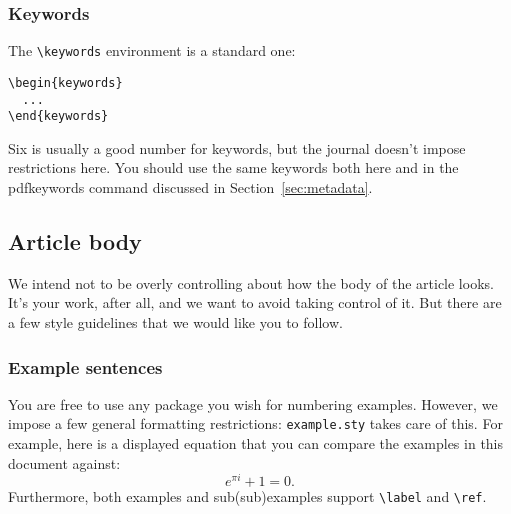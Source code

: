 \documentclass[lucida,final]{sp}
\newcommand{\spfile}[1]{\texttt{#1}}
\newcommand{\cmd}[1]{\texttt{\textbackslash#1}}
\begin{document}
\subsubsection{Keywords}

The \cmd{keywords} environment is a standard one:
%
\begin{Verbatim}
\begin{keywords}
  ...
\end{keywords}
\end{Verbatim}
%
Six is usually a good number for keywords, but the journal doesn't
impose restrictions here. You should use the same keywords both here
and in the pdfkeywords command discussed in Section~\ref{sec:metadata}.


\subsection{Article body}

We intend not to be overly controlling about how the body of the
article looks.  It's your work, after all, and we want to avoid taking
control of it.  But there are a few style guidelines that we would
like you to follow.


\subsubsection{Example sentences}\label{sec:examples}

You are free to use any package you wish for numbering examples.
However, we impose a few general formatting restrictions:
%
\spfile{example.sty} takes care of this.  For example, here is a
displayed equation that you can compare the examples in this document
against:
%
\begin{equation}
  e^{\pi i} + 1 = 0.
\end{equation}
%
Furthermore, both examples and sub(sub)examples support \cmd{label}
and \cmd{ref}.
\end{document}
